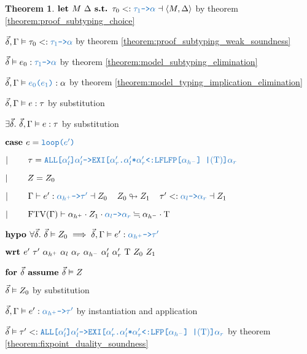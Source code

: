 \documentclass[acmsmall]{acmart}
\theoremstyle{definition}
\newtheorem{theorem}{Theorem}[section]
\begin{document}
\begin{theorem}
    \item \Z\Z $
      \B{let } M\ \Delta
      \B{ s.t. }
      \tau_0 \subtypes \obj{$\tau_1$->$\alpha$} \given \left<M, \Delta \right>
    $ by theorem \ref{theorem:proof_subtyping_choice} 
    \item \Z\Z $
      \vec{\delta}, \Gamma \satisfies \tau_0 \subtypes \obj{$\tau_1$->$\alpha$} 
    $ by theorem \ref{theorem:proof_subtyping_weak_soundness} 
    \item \Z\Z $
      \vec{\delta} \satisfies e_0 \hastype \obj{$\tau_1$->$\alpha$} 
    $ by theorem \ref{theorem:model_subtyping_elimination} 
    \item \Z\Z $
      \vec{\delta}, \Gamma \satisfies \obj{$e_0$($e_1$)} \hastype \alpha
    $ by theorem \ref{theorem:model_typing_implication_elimination} 
    \item \Z\Z $
      \vec{\delta}, \Gamma \vDash e : \tau
    $ by substitution 
    \item \Z\Z $
      \exists \vec{\delta} .\ \vec{\delta}, \Gamma \vDash e : \tau
    $ by substitution 

  \item \Z $\B{case } 
    e = \obj{loop($e'$)} 
  $ 
  \item \Z $\contin  
    \tau = \obj{ALL[$\alpha_l'$]$\alpha_l'$->EXI[$\alpha_r'$.$\alpha_l'$*$\alpha_r'$<:LFLFP[$\alpha_{h^-}$] |$(\Tau)$]$\alpha_r$} 
  $
  \item \Z $|\ \ \ \ \ \ \  
    Z = Z_0 
  $
  \item \Z $\contin  
    \Gamma \entails e' \hastype \obj{$\alpha_{h^+}$->$\tau'$} \given Z_0
    \I
    Z_0 \looparrowright Z_1
    \I
    \tau' \subtypes \obj{$\alpha_l$->$\alpha_r$} \given Z_1
  $ 
  \item \Z $\contin  
    \text{FTV}(\Gamma) \entails \alpha_{h^+} \cdot Z_1 \cdot \obj{$\alpha_l$->$\alpha_r$} \fallingdotseq \alpha_{h^-} \cdot \Tau
  $
  \item \Z $\B{hypo } 
    \forall \vec{\delta} .\ \vec{\delta} \satisfies Z_0 \implies
    \vec{\delta}, \Gamma \satisfies e' \hastype \obj{$\alpha_{h^+}$->$\tau'$}
  $ 
  \item \Z $\B{wrt } e'\ \tau'\ \alpha_{h^+}\ \alpha_l\ \alpha_r\ \alpha_{h^-}\ \alpha_l'\ \alpha_r'\ \Tau\ Z_0\ Z_1 $ 
    \item \Z\Z $\textbf{for } \vec{\delta} \textbf{ assume } \vec{\delta} \vDash Z$
      \item \Z\Z\Z $\vec{\delta} \vDash Z_0$ by substitution
      \item \Z\Z\Z $
        \vec{\delta}, \Gamma \satisfies e' \hastype \obj{$\alpha_{h^+}$->$\tau'$}
      $ by instantiation and application
      \item \Z\Z\Z $
        \vec{\delta} \satisfies \tau' \subtypes 
        \obj{ALL[$\alpha_l'$]$\alpha_l'$->EXI[$\alpha_r'$.$\alpha_l'$*$\alpha_r'$<:LFP[$\alpha_{h^-}$] |$(\Tau)$]$\alpha_r$}
      $ by theorem \ref{theorem:fixpoint_duality_soundness}


\end{theorem}
\end{document}
